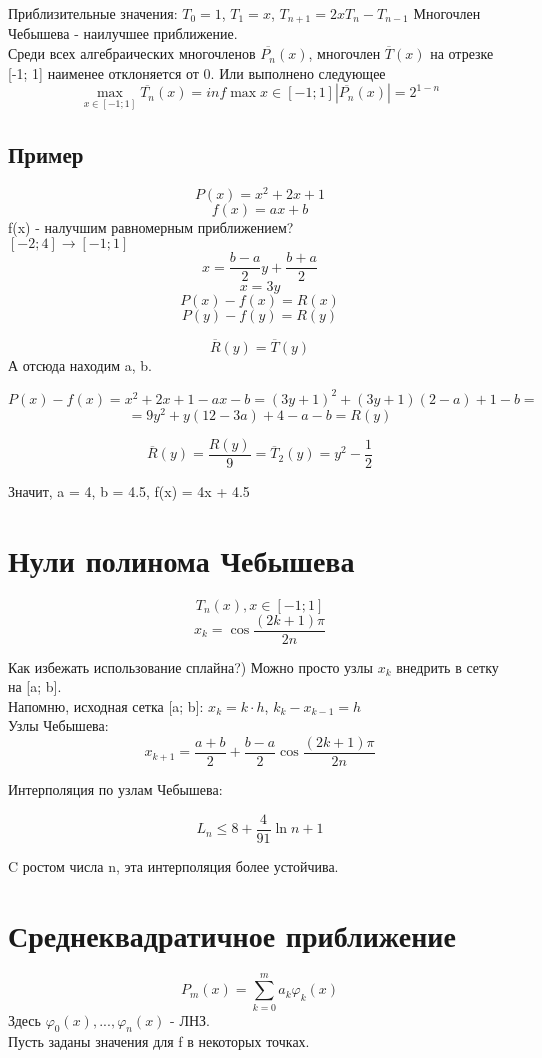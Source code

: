 \documentclass[a4paper,12pt]{article}
\begin{document}
Приблизительные значения: $T_0 = 1$, $T_1 = x$, $T_{n+1} = 2x T_n - T_{n-1}$
Многочлен Чебышева - наилучшее приближение.\\
Среди всех алгебраических многочленов $\overline{P_n}(x)$, многочлен $\overline{T}(x)$ на отрезке [-1; 1] наименее отклоняется от 0. Или выполнено следующее
\[\max_{x \in [-1; 1]} {\overline{T_n}(x)} = inf \max{x \in [-1; 1]} |\overline{P_n}(x)| = 2 ^ {1-n}\]

\subsection*{Пример}
\[P(x) = x ^ 2 + 2x + 1\]
\[f(x) = ax + b\]
f(x) - налучшим равномерным приближением?\\

$[-2; 4] \longrightarrow [-1; 1]$
\[x = \frac{b-a}{2}y + \frac{b+a}{2}\]
\[x = 3y\]
\[P(x) - f(x) = R(x)\]
\[P(y) - f(y) = R(y)\]

\[\overline{R}(y) = \overline{T}(y)\]
А отсюда находим a, b.

\[P(x) - f(x) = x^2 + 2x + 1 -ax - b = (3y+1)^2 + (3y+1)(2-a) + 1 -b = \]
\[= 9y^2 + y (12 - 3a) + 4 - a - b = R(y)\]

\[\overline{R}(y) = \frac{R(y)}{9} = \overline{T}_2(y) = y^2 - \frac{1}{2}\]


Значит, a = 4, b = 4.5, f(x) = 4x + 4.5

\section*{Нули полинома Чебышева}

\[T_n(x), x \in [-1; 1]\]
\[x_k = \cos{\frac{(2k+1)\pi}{2n}}\]

Как избежать использование сплайна?) Можно просто узлы $x_k$ внедрить в сетку на [a; b].\\
Напомню, исходная сетка [a; b]: $x_k = k \cdot h$, $k_k - x_{k-1} = h$\\

Узлы Чебышева:
\[x_{k+1} = \frac{a+b}{2} + \frac{b-a}{2}\cos{\frac{(2k+1)\pi}{2n}}\]

Интерполяция по узлам Чебышева:

\[L_n \leq 8 + \frac{4}{91} \ln{n + 1}\]

C ростом числа n, эта интерполяция более устойчива.

\section*{Среднеквадратичное приближение}
\[P_m(x) = \sum_{k=0}^m a_k \varphi_k(x)\]
Здесь $\varphi_0(x), ..., \varphi_n(x) $ - ЛНЗ.\\ 
Пусть заданы значения для f в некоторых точках.
\end{document}
